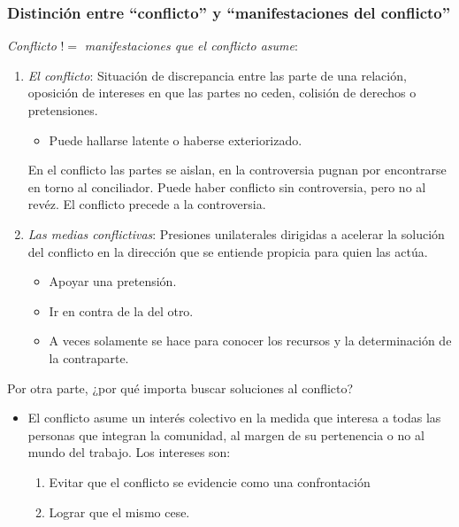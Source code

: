 \documentclass[spanish,12pt,a4paper,titlepage]{report}
\begin{document}
\subsubsection{Distinción entre ``conflicto'' y ``manifestaciones del conflicto''}
\label{sec:Distincion-conflicto-y-manifestaciones-del-conflicto}

\textit{Conflicto} $!=$ \textit{manifestaciones que el conflicto asume}:
\begin{enumerate}
\item \textit{El conflicto}: Situación de discrepancia entre las parte de una relación, oposición de intereses en que las partes no ceden, colisión de derechos o pretensiones.
  \begin{itemize}
  \item Puede hallarse latente o haberse exteriorizado.
  \end{itemize}
  En el conflicto las partes se aislan, en la controversia pugnan por encontrarse en torno al conciliador. Puede haber conflicto sin controversia, pero no al revéz. El conflicto precede a la controversia.
\item \textit{Las medias conflictivas}: Presiones unilaterales dirigidas a acelerar la solución del conflicto en la dirección que se entiende propicia para quien las actúa.
  \begin{itemize}
  \item Apoyar una pretensión.
  \item Ir en contra de la del otro.
  \item A veces solamente se hace para conocer los recursos y la determinación de la contraparte.
  \end{itemize}
\end{enumerate}

Por otra parte, ¿por qué importa buscar soluciones al conflicto?

\begin{itemize}
\item El conflicto asume un interés colectivo en la medida que interesa a todas las personas que integran la comunidad, al margen de su pertenencia o no al mundo del trabajo. Los intereses son:
  \begin{enumerate}
  \item Evitar que el conflicto se evidencie como una confrontación
  \item Lograr que el mismo cese.
  \end{enumerate}
\end{itemize}
\end{document}
